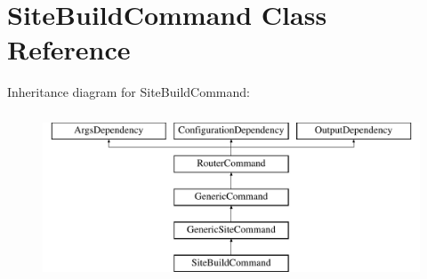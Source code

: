 \hypertarget{classSiteBuildCommand}{\section{Site\-Build\-Command Class Reference}
\label{classSiteBuildCommand}
}
Inheritance diagram for Site\-Build\-Command\-:\begin{figure}[H]
\begin{center}
\leavevmode
\includegraphics[height=5.000000cm]{classSiteBuildCommand}
\end{center}
\end{figure}
